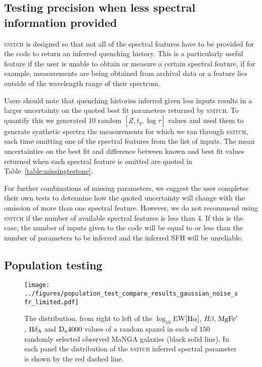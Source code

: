 \documentclass[useAMS,usenatbib]{mn2e}
\begin{document}
\subsection{Testing precision when less spectral information provided}\label{sec:missingtest}



\textsc{snitch} is designed so that not all of the spectral features have to be provided for the code to return an inferred quenching history. This is a particularly useful feature if the user is unable to obtain or measure a certain spectral feature, if for example, measurements are being obtained from archival data or a feature lies outside of the wavelength range of their spectrum. 

Users should note that quenching histories inferred given less inputs results in a larger uncertainty on the quoted best fit parameters returned by \textsc{snitch}. To quantify this we generated 10 random $[Z, t_q, \log \tau]$ values and used them to generate synthetic spectra the measurements for which we ran through \textsc{snitch}, each time omitting one of the spectral features from the list of inputs. The mean uncertainties on the best fit and difference between known and best fit values returned when each spectral feature is omitted are quoted in Table~\ref{table:missingtestone}. 

For further combinations of missing parameters, we suggest the user completes their own tests to determine how the quoted uncertainty will change with the omission of more than one spectral feature. However, we do not recommend using \textsc{snitch} if the number of available spectral features is less than $4$. If this is the case, the number of inputs given to the code will be equal to or less than the number of parameters to be inferred and the inferred SFH will be unreliable. 

\subsection{Population testing}\label{sec:poptest}

\begin{figure*}
\centering
\texttt{[image: ../figures/population\_test\_compare\_results\_gaussian\_noise\_sfr\_limited.pdf]}
\caption{The distribution, from right to left of the $\log_{10}$EW$[\rm{H}\alpha]$, $H\beta$, $\rm{MgFe'}$, $\rm{H}\delta_A$ and $\rm{D_n4000}$ values of a random spaxel in each of $150$ randomly selected observed MaNGA galaxies (black solid line). In each panel the distribution of the \textsc{snitch} inferred spectral parameter is shown by the red dashed line.}
\label{fig:mangacompare}
\end{figure*}
\end{document}
